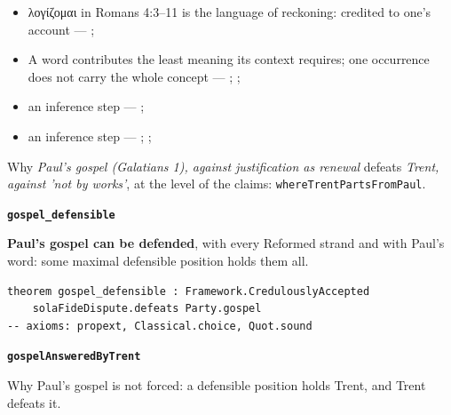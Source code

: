 \documentclass[11pt]{article}
\begin{document}
\begin{itemize}
\begin{itemize}
\item λογίζομαι in Romans 4:3–11 is the language of reckoning: credited to one's account --- \cite[s.v. λογίζομαι]{bauer-danker-lexicon-2000}; \cite[ad loc. Rom 4:3]{moo-romans-1996}
\item A word contributes the least meaning its context requires; one occurrence does not carry the whole concept --- \cite{silva-biblical-words-1994}; \cite{joos-semantic-axiom-1972}; \cite{barr-semantics-2004}
\item an inference step --- \cite[ad loc. Rom 4:6]{moo-romans-1996}; \cite[s.v. λογίζομαι]{bauer-danker-lexicon-2000}
\item an inference step --- \cite{silva-biblical-words-1994}; \cite[p. 80]{moo-romans-1996}; \cite{barr-semantics-2004}
\end{itemize}
\end{itemize}
\noindent Why \emph{Paul's gospel (Galatians 1), against justification as renewal} defeats \emph{Trent, against 'not by works'}, at the level of the claims: \texttt{where\allowbreak{}Trent\allowbreak{}Parts\allowbreak{}From\allowbreak{}Paul}.
\par\medskip\noindent\textbf{\texttt{gospel\_\allowbreak{}defensible}}\par\nobreak\noindent
\textbf{Paul's gospel can be defended}, with every Reformed strand and with Paul's word: some maximal defensible position holds them all.

{\small\begin{verbatim}
theorem gospel_defensible : Framework.CredulouslyAccepted
    solaFideDispute.defeats Party.gospel
-- axioms: propext, Classical.choice, Quot.sound
\end{verbatim}}
\par\medskip\noindent\textbf{\texttt{gospel\allowbreak{}Answered\allowbreak{}By\allowbreak{}Trent}}\par\nobreak\noindent
Why Paul's gospel is not forced: a defensible position holds Trent, and Trent defeats it.
\end{document}
